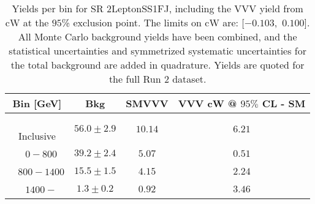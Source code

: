 \begin{table}[!htbp]
    \small
    \center
    \begin{tabular}{c||c|c|c}
    Bin [GeV] & Bkg & SMVVV & \pbox{20cm}{VVV \\ cW @ $95\%$ CL - SM \\ }\\
    \hline
    \pbox{20cm}{ ~ \\Inclusive\\ } & $56.0 \pm 2.9$ & $10.14$ & $6.21$\\
    \hline
    \pbox{20cm}{ ~ \\$0-800$\\ } & $39.2 \pm 2.4$ & $5.07$ & $0.51$\\
    \hline
    \pbox{20cm}{ ~ \\$800-1400$\\ } & $15.5 \pm 1.5$ & $4.15$ & $2.24$\\
    \hline
    \pbox{20cm}{ ~ \\$1400-$\\ } & $1.3 \pm 0.2$ & $0.92$ & $3.46$\\
\end{tabular}
    \caption{Yields per bin for SR 2LeptonSS1FJ, including the VVV yield from cW at the $95$\% exclusion point. The limits on cW are: [$-0.103$,~$0.100$]. All Monte Carlo background yields have been combined, and the statistical uncertainties and symmetrized systematic uncertainties for the total background are added in quadrature. Yields are quoted for the full Run 2 dataset.}
    \label{tab:2LeptonSS1FJ$binssignal}
\end{table}
